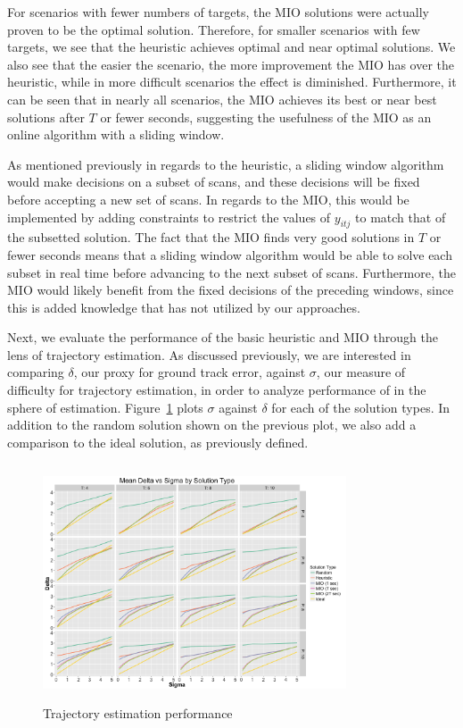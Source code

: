 \documentclass[journal]{IEEEtran}
\begin{document}
For scenarios with fewer numbers of targets, the MIO solutions were actually proven to be the optimal solution. Therefore, for smaller scenarios with few targets, we see that the heuristic achieves optimal and near optimal solutions. We also see that the easier the scenario, the more improvement the MIO has over the heuristic, while in more difficult scenarios the effect is diminished. Furthermore, it can be seen that in nearly all scenarios, the MIO achieves its best or near best solutions after $T$ or fewer seconds, suggesting the usefulness of the MIO as an online algorithm with a sliding window. 

As mentioned previously in regards to the heuristic, a sliding window algorithm would make decisions on a subset of scans, and these decisions will be fixed before accepting a new set of scans. In regards to the MIO, this would be implemented by adding constraints to restrict the values of $y_{itj}$ to match that of the subsetted solution. The fact that the MIO finds very good solutions in $T$ or fewer seconds means that a sliding window algorithm would be able to solve each subset in real time before advancing to the next subset of scans. Furthermore, the MIO would likely benefit from the fixed decisions of the preceding windows, since this is added knowledge that has not utilized by our approaches.

Next, we evaluate the performance of the basic heuristic and MIO through the lens of trajectory estimation. As discussed previously, we are interested in comparing $\delta$, our proxy for ground track error, against $\sigma$, our measure of difficulty for trajectory estimation, in order to analyze performance of in the sphere of estimation. Figure~\ref{Fig:Basic_Delta_Summary} plots $\sigma$ against $\delta$ for each of the solution types. In addition to the random solution shown on the previous plot, we also add a comparison to the ideal solution, as previously defined.
\begin{figure}[h]
  \centering
  \includegraphics[width=9cm, height=7cm]{Basic_Delta_Summary}
  \caption{Trajectory estimation performance}
  \label{Fig:Basic_Delta_Summary}
\end{figure}
\end{document}
